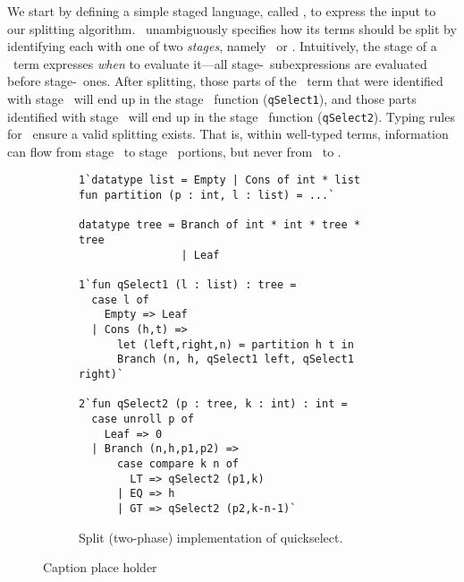 We start by defining a simple staged language, called \lang, to express the input to our splitting algorithm.  
\lang\ unambiguously specifies how its terms should be split
by identifying each with one of two {\em stages}, namely \bbone\ or \bbtwo.
Intuitively, the stage of a \lang\ term expresses \emph{when} to evaluate it---all stage-\bbone\
subexpressions are evaluated before stage-\bbtwo\ ones.  
After splitting, those parts of the \lang\ term that were identified with stage \bbone\ 
will end up in the stage \bbone\ function ({\tt qSelect1}), 
and those parts identified with stage \bbtwo\ will end up in the stage \bbtwo\ function ({\tt qSelect2}).
Typing rules for \lang\ ensure a valid splitting exists.  That is, 
within well-typed terms, information can flow from stage \bbone\ to stage \bbtwo\ portions,
but never from \bbtwo\ to \bbone.





\begin{figure}

\begin{subfigure}{0.5\textwidth}
\begin{lstlisting}
1`datatype list = Empty | Cons of int * list
fun partition (p : int, l : list) = ...`
	
datatype tree = Branch of int * int * tree * tree
                | Leaf

1`fun qSelect1 (l : list) : tree =
  case l of
    Empty => Leaf
  | Cons (h,t) => 
      let (left,right,n) = partition h t in
      Branch (n, h, qSelect1 left, qSelect1 right)`

2`fun qSelect2 (p : tree, k : int) : int = 
  case unroll p of
    Leaf => 0
  | Branch (n,h,p1,p2) => 
      case compare k n of
        LT => qSelect2 (p1,k)
      | EQ => h
      | GT => qSelect2 (p2,k-n-1)`
\end{lstlisting}
\caption{Split (two-phase) implementation of quickselect.}
\label{fig:qssplit}
\end{subfigure}
\caption{Caption place holder}
\end{figure}



